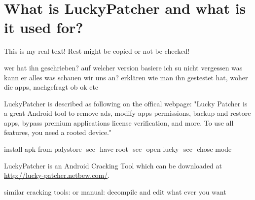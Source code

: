 \section{What is LuckyPatcher and what is it used for?} \label{section:luckypatcher-explain}
This is my real text! Rest might be copied or not be checked!


wer hat ihn geschrieben?\newline
auf welcher version basiere ich\newline
su nicht vergessen\newline
was kann er alles\newline
was schauen wir uns an?\newline
erklären wie man ihn gestestet hat, woher die apps, nachgefragt ob ok etc\newline

LuckyPatcher is described as following on the offical webpage: "Lucky Patcher is a great Android tool to remove ads, modify apps permissions, backup and restore apps, bypass premium applications license verification, and more. To use all features, you need a rooted device." \cite{luckyPatcherOfficial}

install apk from palystore -see- have root -see- open lucky -see- chose mode

LuckyPatcher is an Android Cracking Tool which can be downloaded at \url{http://lucky-patcher.netbew.com/}.

similar cracking tools:\newline
or manual: decompile and edit what ever you want \newline
